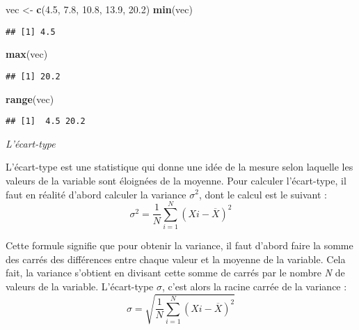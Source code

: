 \documentclass[
  french,
]{book}
\newenvironment{Shaded}{\begin{snugshade}}{\end{snugshade}}
\newcommand{\FloatTok}[1]{\textcolor[rgb]{0.00,0.00,0.81}{#1}}
\newcommand{\KeywordTok}[1]{\textcolor[rgb]{0.13,0.29,0.53}{\textbf{#1}}}
\newcommand{\NormalTok}[1]{#1}
\newcommand{\StringTok}[1]{\textcolor[rgb]{0.31,0.60,0.02}{#1}}
\begin{document}
\begin{Shaded}
\begin{Highlighting}[]
\NormalTok{vec <-}\StringTok{ }\KeywordTok{c}\NormalTok{(}\FloatTok{4.5}\NormalTok{, }\FloatTok{7.8}\NormalTok{, }\FloatTok{10.8}\NormalTok{, }\FloatTok{13.9}\NormalTok{, }\FloatTok{20.2}\NormalTok{)}
\KeywordTok{min}\NormalTok{(vec)}
\end{Highlighting}
\end{Shaded}

\begin{verbatim}
## [1] 4.5
\end{verbatim}

\begin{Shaded}
\begin{Highlighting}[]
\KeywordTok{max}\NormalTok{(vec)}
\end{Highlighting}
\end{Shaded}

\begin{verbatim}
## [1] 20.2
\end{verbatim}

\begin{Shaded}
\begin{Highlighting}[]
\KeywordTok{range}\NormalTok{(vec)}
\end{Highlighting}
\end{Shaded}

\begin{verbatim}
## [1]  4.5 20.2
\end{verbatim}

\emph{L'écart-type}

L'écart-type est une statistique qui donne une idée de la mesure selon laquelle les valeurs de la variable sont éloignées de la moyenne. Pour calculer l'écart-type, il faut en réalité d'abord calculer la variance \(\sigma^2\), dont le calcul est le suivant :
\[\sigma^2 = \frac{1}{N}\sum_{i=1}^{N} (X{i} - \overline{X})^2\]

Cette formule signifie que pour obtenir la variance, il faut d'abord faire la somme des carrés des différences entre chaque valeur et la moyenne de la variable. Cela fait, la variance s'obtient en divisant cette somme de carrés par le nombre \emph{N} de valeurs de la variable. L'écart-type \(\sigma\), c'est alors la racine carrée de la variance :
\[\sigma = \sqrt{\frac{1}{N}\sum_{i=1}^{N} (X{i} - \overline{X})^2}\]
\end{document}

